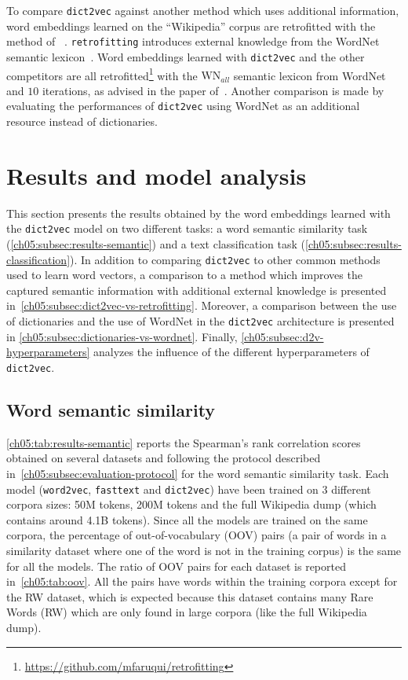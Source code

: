       To compare \texttt{dict2vec} against another method which uses additional
      information, word embeddings learned on the ``Wikipedia'' corpus are
      retrofitted with the method of ~\cite{faruqui2015retrofitting}.
      \texttt{retrofitting} introduces external knowledge from the WordNet
      semantic lexicon~\citep{miller1995wordnet}. Word embeddings learned with
      \texttt{dict2vec} and the other competitors are all
      retrofitted\footnote{\url{https://github.com/mfaruqui/retrofitting}} with
      the $\text{WN}_{all}$ semantic lexicon from WordNet and $10$ iterations,
      as advised in the paper of~\citeauthor{faruqui2015retrofitting}. Another
      comparison is made by evaluating the performances of \texttt{dict2vec}
      using WordNet as an additional resource instead of dictionaries.

\section{Results and model analysis}
  \label{ch05:sec:results}
  This section presents the results obtained by the word embeddings learned with
  the \texttt{dict2vec} model on two different tasks: a word semantic similarity
  task (\autoref{ch05:subsec:results-semantic}) and a text classification task
  (\autoref{ch05:subsec:results-classification}). In addition to comparing
  \texttt{dict2vec} to other common methods used to learn word vectors, a
  comparison to a method which improves the captured semantic information with
  additional external knowledge is presented
  in~\autoref{ch05:subsec:dict2vec-vs-retrofitting}. Moreover, a comparison
  between the use of dictionaries and the use of WordNet in the
  \texttt{dict2vec} architecture is presented in
  \autoref{ch05:subsec:dictionaries-vs-wordnet}. Finally,
  \autoref{ch05:subsec:d2v-hyperparameters} analyzes the influence of the
  different hyperparameters of \texttt{dict2vec}.

  \subsection{Word semantic similarity}
    \label{ch05:subsec:results-semantic}

    \autoref{ch05:tab:results-semantic} reports the Spearman's rank correlation
    scores obtained on several datasets and following the protocol described
    in~\autoref{ch05:subsec:evaluation-protocol} for the word semantic
    similarity task. Each model (\texttt{word2vec}, \texttt{fasttext} and
    \texttt{dict2vec}) have been trained on 3 different corpora sizes: 50M
    tokens, 200M tokens and the full Wikipedia dump (which contains around 4.1B
    tokens). Since all the models are trained on the same corpora, the
    percentage of out-of-vocabulary (OOV) pairs (a pair of words in a similarity
    dataset where one of the word is not in the training corpus) is the same for
    all the models. The ratio of OOV pairs for each dataset is reported
    in~\autoref{ch05:tab:oov}. All the pairs have words within the training
    corpora except for the RW dataset, which is expected because this dataset
    contains many Rare Words (RW) which are only found in large corpora (like
    the full Wikipedia dump).


